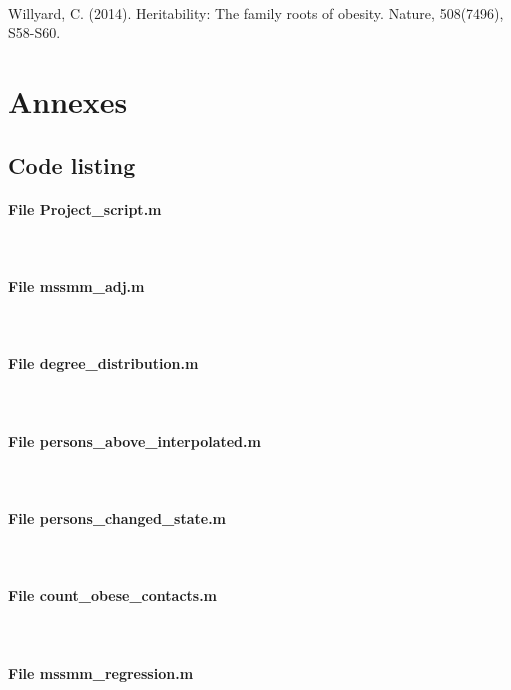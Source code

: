 \documentclass[11pt]{article}
\begin{document}
\paragraph{}
Willyard, C. (2014). Heritability: The family roots of obesity. Nature, 508(7496), S58-S60.




\newpage
\section{Annexes}
\subsection{Code listing}
\lstset{breaklines=true}

\paragraph{File Project\_script.m} \


\paragraph{File mssmm\_adj.m} \


\paragraph{File degree\_distribution.m} \


\paragraph{File persons\_above\_interpolated.m} \


\paragraph{File persons\_changed\_state.m} \


\paragraph{File count\_obese\_contacts.m} \


\paragraph{File mssmm\_regression.m} \

\end{document}
